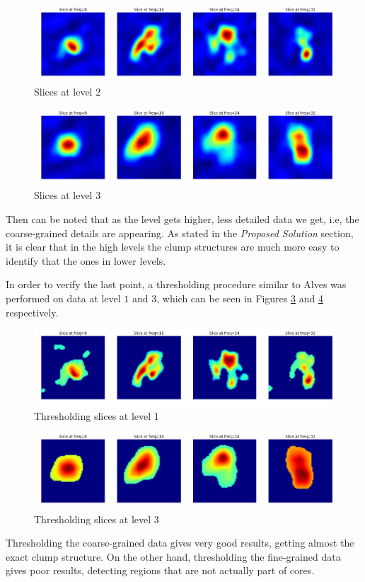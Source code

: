 \documentclass[letter, 11pt]{article}
\begin{document}
\begin{figure}[htpb!]
\centering
\includegraphics[width=14cm]{level2}
\caption{Slices at level 2}
\label{fig:level2}
\end{figure}

\begin{figure}[htpb!]
\centering
\includegraphics[width=14cm]{level3}
\caption{Slices at level 3}
\label{fig:level3}
\end{figure}

Then can be noted that as the level gets higher, less detailed data we get, i.e, the coarse-grained details are appearing. As stated in the \textit{Proposed Solution} section, it is clear that in the high levels the clump structures are much more easy to identify that the ones in lower levels.

In order to verify the last point, a thresholding procedure similar to Alves \cite{Alves} was performed on data at level $1$ and $3$, which can be seen in Figures \ref{fig:th1} and \ref{fig:th3} respectively.
\begin{figure}[htpb!]
\centering
\includegraphics[width=14cm]{threshold1}
\caption{Thresholding slices at level 1}
\label{fig:th1}
\end{figure}

\begin{figure}[htpb!]
\centering
\includegraphics[width=14cm]{threshold2}
\caption{Thresholding slices at level 3}
\label{fig:th3}
\end{figure}
Thresholding the coarse-grained data gives very good results, getting almost the exact clump structure. On the other hand, thresholding the fine-grained data gives poor results, detecting regions that are not actually part of cores.

\newpage
{}

\end{document}
